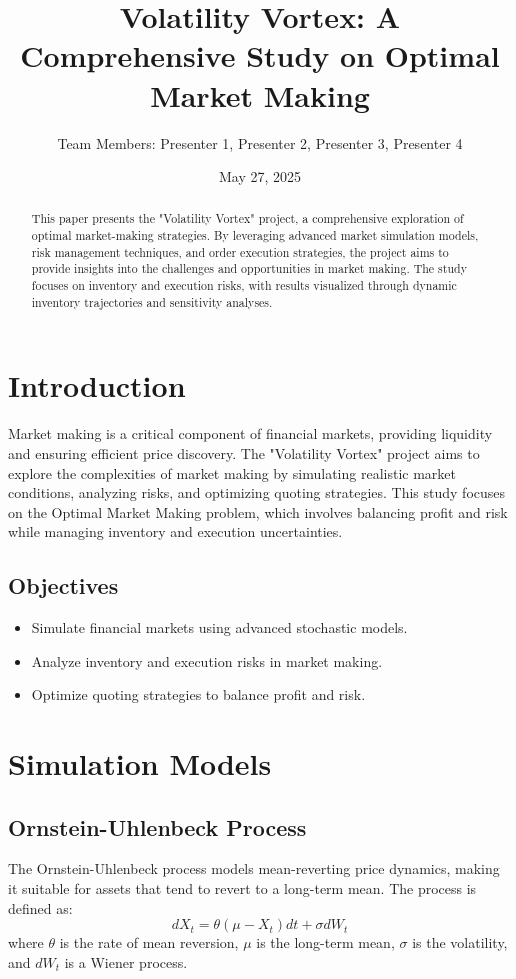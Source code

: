 \documentclass{beamer}
\title{Volatility Vortex: A Comprehensive Study on Optimal Market Making}
\author{Team Members: Presenter 1, Presenter 2, Presenter 3, Presenter 4}
\date{May 27, 2025}
\begin{document}
\maketitle

\begin{abstract}
This paper presents the "Volatility Vortex" project, a comprehensive exploration of optimal market-making strategies. By leveraging advanced market simulation models, risk management techniques, and order execution strategies, the project aims to provide insights into the challenges and opportunities in market making. The study focuses on inventory and execution risks, with results visualized through dynamic inventory trajectories and sensitivity analyses.
\end{abstract}

\section{Introduction}
Market making is a critical component of financial markets, providing liquidity and ensuring efficient price discovery. The "Volatility Vortex" project aims to explore the complexities of market making by simulating realistic market conditions, analyzing risks, and optimizing quoting strategies. This study focuses on the Optimal Market Making problem, which involves balancing profit and risk while managing inventory and execution uncertainties.

\subsection{Objectives}
\begin{itemize}
    \item Simulate financial markets using advanced stochastic models.
    \item Analyze inventory and execution risks in market making.
    \item Optimize quoting strategies to balance profit and risk.
\end{itemize}

\section{Simulation Models}
\subsection{Ornstein-Uhlenbeck Process}
The Ornstein-Uhlenbeck process models mean-reverting price dynamics, making it suitable for assets that tend to revert to a long-term mean. The process is defined as:
\begin{equation}
    dX_t = \theta(\mu - X_t)dt + \sigma dW_t
\end{equation}
where $\theta$ is the rate of mean reversion, $\mu$ is the long-term mean, $\sigma$ is the volatility, and $dW_t$ is a Wiener process.
\end{document}
